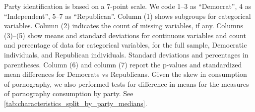 \documentclass[12pt, letterpaper]{article}
\begin{document}
\begin{table}[ht]
{		Party identification is based on a 7-point scale. We code 1--3 as ``Democrat'', 4 as ``Independent'', 5--7 as ``Republican''.
		Column (1) shows subgroups for categorical variables.
		Column (2) indicates the count of missing variables, if any.
		Columns (3)--(5) show means and standard deviations for continuous variables and count and percentage of data for categorical variables, for the full sample, Democratic individuals, and Republican individuals.
		Standard deviations and percentages in parentheses.
		Column (6) and column (7) report the p-values and standardized mean differences for Democrats vs Republicans.
		Given the skew in consumption of pornography, we also performed tests for difference in means for the measures of pornography consumption by party. See \cref{tab:characteristics_split_by_party_medians}.
	}
\end{table}
\end{document}
